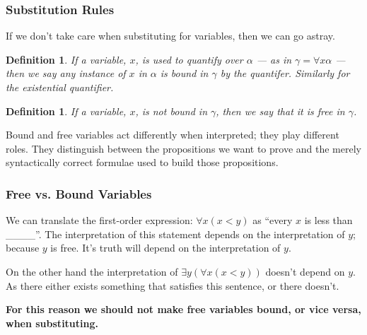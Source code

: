 \documentclass{beamer}
\theoremstyle{indentDefn} \newtheorem{defn}[]{Definition}
\begin{document}
\begin{frame}
	\frametitle{Substitution Rules}
	
	If we don't take care when substituting for variables, then we can go astray. 
	
	\vspace{0.5cm}	

	\begin{defn}
		If a variable, $x$, is used to quantify over $\alpha$ --- as in $\gamma = \forall x \alpha$ --- then we say any instance of $x$ in $\alpha$ is \emph{bound} in $\gamma$ by the quantifer. Similarly for the existential quantifier. 
	\end{defn} 

	
	\vspace{0.5cm} 

	\begin{defn}
		If a variable, $x$, is not bound in $\gamma$, then we say that it is free in $\gamma$.
	\end{defn}

	\vspace{0.5cm} 
	
	Bound and free variables act differently when interpreted; they play different roles. They distinguish between the propositions we want to prove and the merely syntactically correct formulae used to build those propositions.
	
\end{frame}

\begin{frame}
	\frametitle{Free vs. Bound Variables}
	
	We can translate the first-order expression: $\forall x (x < y)$ as ``every $x$ is less than \_\_\_\_''. The interpretation of this statement depends on the interpretation of $y$; because $y$ is free. It's truth will depend on the interpretation of $y$.
	
	\vspace{0.5cm} 
	
	On the other hand the interpretation of $\exists y (\forall x (x < y))$ doesn't depend on $y$. As there either exists something that satisfies this sentence, or there doesn't. 
	
	\vspace{0.5cm}

	{\bf For this reason we should not make free variables bound, or vice versa, when substituting.}
	
	
\end{frame}
\end{document}
